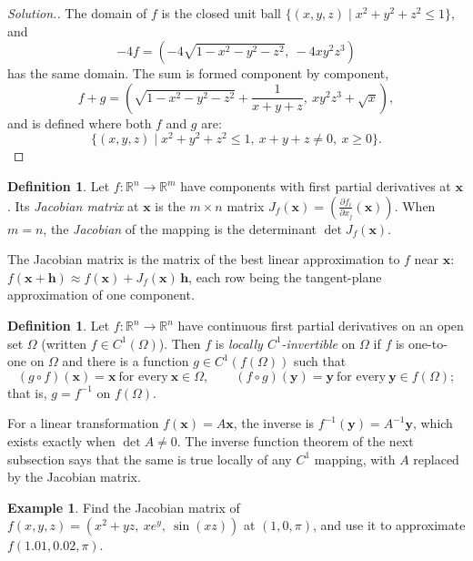 \documentclass[11pt,a4paper]{article}
\theoremstyle{definition}
\newtheorem{defn}[thm]{Definition}
\newtheorem{exa}[thm]{Example}
\newenvironment{solution}
  {\renewcommand{\qedsymbol}{}\begin{proof}[\textit{Solution}.]}
  {\end{proof}}
\begin{document}
\begin{solution}
The domain of $f$ is the closed unit ball $\{(x,y,z) \mid x^2 + y^2 + z^2 \leq
1\}$, and
\[-4f =\left(-4\sqrt{1 - x^2 - y^2 -z^2},\ -4 xy^2z^3\right)\]
has the same domain. The sum is formed component by component,
\[f +g =\left(\sqrt{1 - x^2 - y^2 -z^2} + \frac{1}{x + y + z},\ xy^2z^3 +
\sqrt{x}\right),\]
and is defined where both $f$ and $g$ are:
\[\{ (x,y,z) \mid x^2 + y^2 + z^2 \leq 1,\ x+y+z\neq 0,\ x\geq 0\}.\]
\end{solution}

\begin{defn}
\label{defn:jacobianmap}
Let $f: \mathbb{R}^n \to \mathbb{R}^m$ have components with first partial
derivatives at $\mathbf x$. Its \emph{Jacobian matrix} at $\mathbf x$ is the
$m\times n$ matrix $J_f(\mathbf x) = \left(\frac{\partial f_i}{\partial
x_j}(\mathbf x)\right)$. When $m = n$, the \emph{Jacobian} of the mapping is the
determinant $\det J_f(\mathbf x)$.
\end{defn}

The Jacobian matrix is the matrix of the best linear approximation to $f$ near
$\mathbf x$:
$f(\mathbf x + \mathbf h)\approx f(\mathbf x) + J_f(\mathbf x)\,\mathbf h$, each
row being the tangent-plane approximation of one component.

\begin{defn}
\label{defn:locallyinvertible}
Let $f: \mathbb{R}^n \to \mathbb{R}^n$ have continuous first partial derivatives
on an open set $\Omega$ (written $f\in C^1(\Omega)$). Then $f$ is \emph{locally
$C^1$-invertible} on $\Omega$ if $f$ is one-to-one on $\Omega$ and there is a
function $g\in C^1(f(\Omega))$ such that
\[(g\circ f)(\mathbf x) = \mathbf x\ \text{for every}\ \mathbf x\in
\Omega,\qquad (f\circ g)(\mathbf y) = \mathbf y\ \text{for every}\ \mathbf y \in
f(\Omega) ;\]
that is, $g = f^{-1}$ on $f(\Omega)$.
\end{defn}

For a linear transformation $f(\mathbf x) = A\mathbf x$, the inverse is
$f^{-1}(\mathbf y) = A^{-1}\mathbf y$, which exists exactly when
$\det A\neq 0$. The inverse function theorem of the next subsection says that
the same is true locally of any $C^1$ mapping, with $A$ replaced by the Jacobian
matrix.

\begin{exa}
\label{ex:jacobianmatrix3}
Find the Jacobian matrix of $f(x,y,z) = (x^2 + yz,\ xe^{y},\ \sin(xz))$ at
$(1,0,\pi)$, and use it to approximate $f(1.01, 0.02, \pi)$.
\end{exa}
\end{document}
